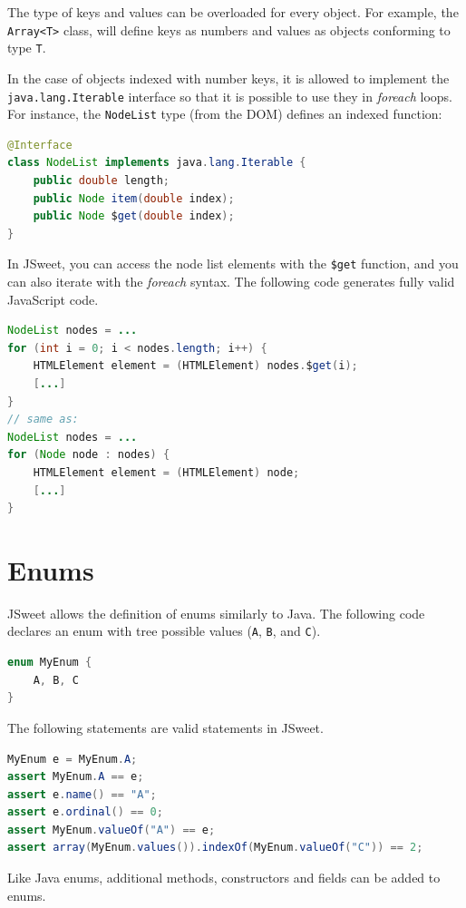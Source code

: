 \documentclass[a4paper]{report}
\begin{document}
The type of keys and values can be overloaded for every object. For example, the \texttt{Array<T>} class, will define keys as numbers and values as objects conforming to type \texttt{T}.

In the case of objects indexed with number keys, it is allowed to implement the \texttt{java.lang.Iterable} interface so that it is possible to use they in \emph{foreach} loops. For instance, the \texttt{NodeList} type (from the DOM) defines an indexed function:

\begin{lstlisting}[language=Java]
@Interface
class NodeList implements java.lang.Iterable {
    public double length;
    public Node item(double index);
    public Node $get(double index);
}
\end{lstlisting}

In JSweet, you can access the node list elements with the \texttt{\$get} function, and you can also iterate with the \emph{foreach} syntax. The following code generates fully valid JavaScript code.

\begin{lstlisting}[language=Java]
NodeList nodes = ...
for (int i = 0; i < nodes.length; i++) {
	HTMLElement element = (HTMLElement) nodes.$get(i);
	[...]
}
// same as:
NodeList nodes = ...
for (Node node : nodes) {
	HTMLElement element = (HTMLElement) node;
	[...]
}
\end{lstlisting}

\section{Enums} 

JSweet allows the definition of enums similarly to Java. The following code declares an enum with tree possible values (\texttt{A}, \texttt{B}, and \texttt{C}).

\begin{lstlisting}[language=Java]
enum MyEnum {
	A, B, C
}
\end{lstlisting}

The following statements are valid statements in JSweet.

\begin{lstlisting}[language=Java]
MyEnum e = MyEnum.A;
assert MyEnum.A == e;
assert e.name() == "A";
assert e.ordinal() == 0;
assert MyEnum.valueOf("A") == e;
assert array(MyEnum.values()).indexOf(MyEnum.valueOf("C")) == 2;
\end{lstlisting}

Like Java enums, additional methods, constructors and fields can be added to enums.
\end{document}

